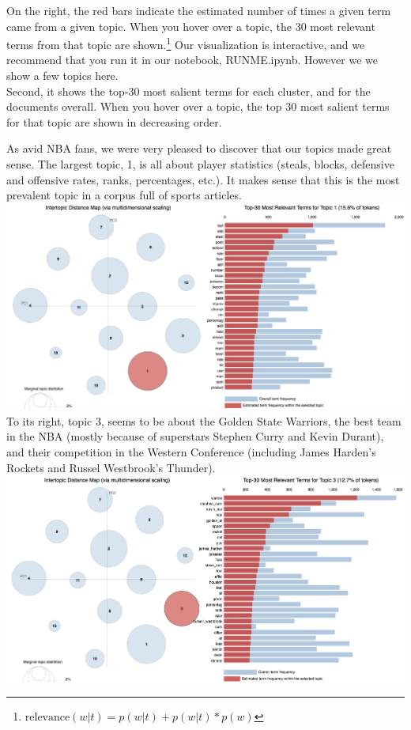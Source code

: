 \documentclass[11pt]{article}
\begin{document}
On the right, the red bars indicate the estimated number of times a given term came from a given topic. When you hover over a topic, the 30 most relevant terms from that topic are shown.\footnote{$\text{relevance}(w | t) = p(w | t) + p(w | t)*p(w)$}  Our visualization is interactive, and we recommend that you run it in our notebook, RUNME.ipynb.  However we we show a few topics here. \\

Second, it shows the top-30 most salient terms for each cluster, and for the documents overall. When you hover over a topic, the top 30 most salient terms for that topic are shown in decreasing order.

As avid NBA fans, we were very pleased to discover that our topics made great sense. The largest topic, 1, is all about player statistics (steals, blocks, defensive and offensive rates, ranks, percentages, etc.). It makes sense that this is the most prevalent topic in a corpus full of sports articles. \\

\includegraphics[width=470pt]{1.png} \\

To its right, topic 3, seems to be about the Golden State Warriors, the best team in the NBA (mostly because of superstars Stephen Curry and Kevin Durant), and their competition in the Western Conference (including James Harden's Rockets and Russel Westbrook's Thunder). \\

\includegraphics[width=470pt]{3.png} \\
\end{document}
